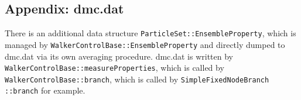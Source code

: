 \subsection{Appendix: dmc.dat}

There is an additional data structure \verb|ParticleSet::EnsembleProperty|, which is managed by \verb|WalkerControlBase::EnsembleProperty| and directly dumped to dmc.dat via its own averaging procedure. dmc.dat is written by \verb|WalkerControlBase::measureProperties|, which is called by \verb|WalkerControlBase::branch|, which is called by \verb|SimpleFixedNodeBranch|\\ \verb|::branch| for example.
